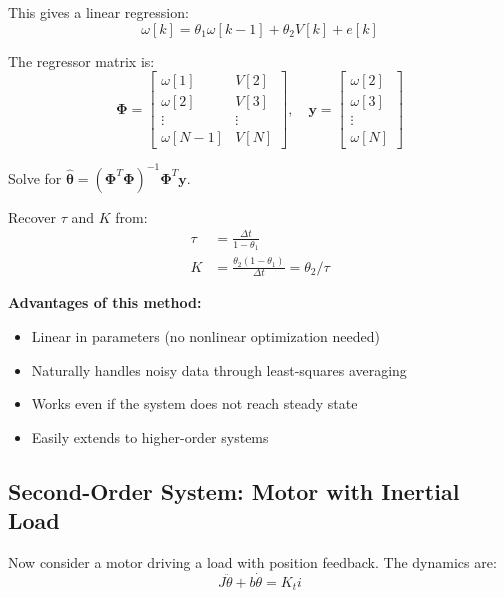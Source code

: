 This gives a linear regression:
\begin{equation}
\omega[k] = \theta_1 \omega[k-1] + \theta_2 V[k] + e[k]
\end{equation}

The regressor matrix is:
\begin{equation}
\mathbf{\Phi} = \begin{bmatrix}
\omega[1] & V[2] \\
\omega[2] & V[3] \\
\vdots & \vdots \\
\omega[N-1] & V[N]
\end{bmatrix}, \quad
\mathbf{y} = \begin{bmatrix}
\omega[2] \\
\omega[3] \\
\vdots \\
\omega[N]
\end{bmatrix}
\end{equation}

Solve for $\hat{\boldsymbol{\theta}} = (\mathbf{\Phi}^T\mathbf{\Phi})^{-1}\mathbf{\Phi}^T\mathbf{y}$.

Recover $\tau$ and $K$ from:
\begin{align}
\tau &= \frac{\Delta t}{1 - \theta_1} \\
K &= \frac{\theta_2(1 - \theta_1)}{\Delta t} = \theta_2 / \tau
\end{align}

\textbf{Advantages of this method:}
\begin{itemize}
    \item Linear in parameters (no nonlinear optimization needed)
    \item Naturally handles noisy data through least-squares averaging
    \item Works even if the system does not reach steady state
    \item Easily extends to higher-order systems
\end{itemize}

\subsection{Second-Order System: Motor with Inertial Load}

Now consider a motor driving a load with position feedback. The dynamics are:
\begin{equation}
J\ddot{\theta} + b\dot{\theta} = K_t i
\end{equation}


